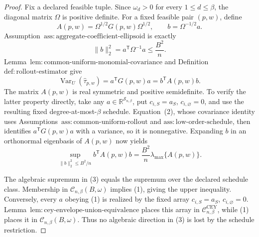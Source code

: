 \documentclass{article}
\begin{document}
\begin{proof}
Fix a declared feasible tuple.  Since \(\omega_d>0\) for every \(1\le d\le\beta\), the diagonal matrix \(\Omega\) is positive definite.  For a fixed feasible pair \((p,w)\), define
\[
A(p,w)=\Omega^{1/2}G(p,w)\Omega^{1/2},
\qquad b=\Omega^{-1/2}a.
\]
Assumption~\(\mathrm{ass{:}aggregate\text{-}coefficient\text{-}ellipsoid}\) is exactly
\[
\lVert b\rVert_2^2=a^{\mathsf T}\Omega^{-1}a\le \frac{B^2}{n}.
\tag{1}
\]
Lemma~\(\mathrm{lem{:}common\text{-}uniform\text{-}monomial\text{-}covariance}\) and Definition~\(\mathrm{def{:}rollout\text{-}estimator}\) give
\[
\operatorname{Var}_U(\widehat\tau_{p,w})
=a^{\mathsf T}G(p,w)a
=b^{\mathsf T}A(p,w)b.
\tag{2}
\]
The matrix \(A(p,w)\) is real symmetric and positive semidefinite.  To verify the latter property directly, take any \(a\in\mathbb R^{\mathcal S_{n,\beta}}\), put \(c_{i,S}=a_S\), \(c_{i,\varnothing}=0\), and use the resulting fixed degree-at-most-\(\beta\) schedule.  Equation~(2), whose covariance identity uses Assumptions~\(\mathrm{ass{:}common\text{-}uniform\text{-}rollout}\) and \(\mathrm{ass{:}low\text{-}order\text{-}schedule}\), then identifies \(a^{\mathsf T}G(p,w)a\) with a variance, so it is nonnegative.  Expanding \(b\) in an orthonormal eigenbasis of \(A(p,w)\) now yields
\[
\sup_{\lVert b\rVert_2^2\le B^2/n}b^{\mathsf T}A(p,w)b
=\frac{B^2}{n}\lambda_{\max}\{A(p,w)\}.
\tag{3}
\]

The algebraic supremum in (3) equals the supremum over the declared schedule class.  Membership in \(\mathcal C_{n,\beta}(B,\omega)\) implies (1), giving the upper inequality.  Conversely, every \(a\) obeying (1) is realized by the fixed array \(c_{i,S}=a_S\), \(c_{i,\varnothing}=0\).  Lemma~\(\mathrm{lem{:}cey\text{-}envelope\text{-}union\text{-}equivalence}\) places this array in \(\mathcal C^{\mathrm{CEY}}_{n,\beta}\), while (1) places it in \(\mathcal C_{n,\beta}(B,\omega)\).  Thus no algebraic direction in (3) is lost by the schedule restriction.


\end{proof}
\end{document}
